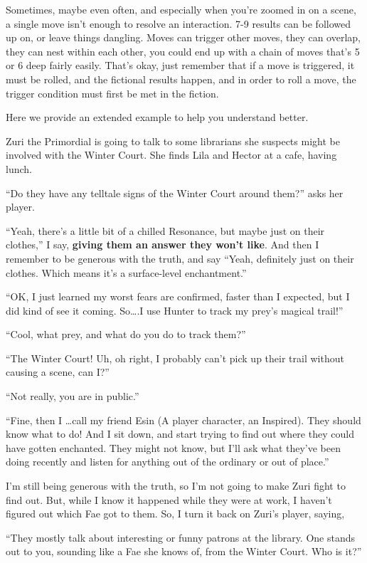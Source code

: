 \documentclass[
  oneside,
  statementpaper,
  9pt]{memoir}
\begin{document}
Sometimes, maybe even often, and especially when you're zoomed in on a
scene, a single move isn't enough to resolve an interaction. 7-9 results
can be followed up on, or leave things dangling. Moves can trigger other
moves, they can overlap, they can nest within each other, you could end
up with a chain of moves that's 5 or 6 deep fairly easily. That's okay,
just remember that if a move is triggered, it must be rolled, and the
fictional results happen, and in order to roll a move, the trigger
condition must first be met in the fiction.

Here we provide an extended example to help you understand better.

Zuri the Primordial is going to talk to some librarians she suspects
might be involved with the Winter Court. She finds Lila and Hector at a
cafe, having lunch.

``Do they have any telltale signs of the Winter Court around them?''
asks her player.

``Yeah, there's a little bit of a chilled Resonance, but maybe just on
their clothes,'' I say, \textbf{giving them an answer they won't like}.
And then I remember to be generous with the truth, and say ``Yeah,
definitely just on their clothes. Which means it's a surface-level
enchantment.''

``OK, I just learned my worst fears are confirmed, faster than I
expected, but I did kind of see it coming. So\ldots.I use Hunter to
track my prey's magical trail!''

``Cool, what prey, and what do you do to track them?''

``The Winter Court! Uh, oh right, I probably can't pick up their trail
without causing a scene, can I?''

``Not really, you are in public.''

``Fine, then I \ldots call my friend Esin (A player character, an
Inspired). They should know what to do! And I sit down, and start trying
to find out where they could have gotten enchanted. They might not know,
but I'll ask what they've been doing recently and listen for anything
out of the ordinary or out of place.''

I'm still being generous with the truth, so I'm not going to make Zuri
fight to find out. But, while I know it happened while they were at
work, I haven't figured out which Fae got to them. So, I turn it back on
Zuri's player, saying,

``They mostly talk about interesting or funny patrons at the library.
One stands out to you, sounding like a Fae she knows of, from the Winter
Court. Who is it?''
\end{document}
